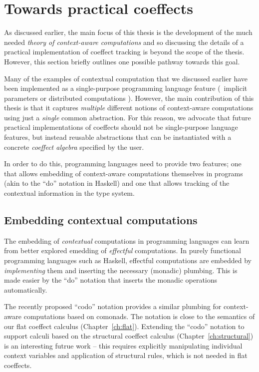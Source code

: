 \section{Towards practical coeffects}
\label{sec:unified-impl}

As discussed earlier, the main focus of this thesis is the development of the much needed 
\emph{theory of context-aware computations} and so discussing the details of a practical 
implementation of coeffect tracking is beyond the scope of the thesis. However, this section
briefly outlines one possible pathway towards this goal.

Many of the examples of contextual computation that we discussed earlier have been implemented as 
a single-purpose programming language feature (\eg~implicit parameters \cite{app-implicit-parameters} 
or distributed computations \cite{app-distributed-ml5,app-distributed-links}). However, 
the main contribution of this thesis is that it captures
\emph{multiple} different notions of context-aware computations using just a \emph{single}
common abstraction. For this reason, we advocate that future practical implementations of
coeffects should not be single-purpose language features, but instead reusable abstractions that
can be instantiated with a concrete \emph{coeffect algebra} specified by the user.

In order to do this, programming languages need to provide two features; one that allows 
embedding of context-aware computations themselves in programs (akin to the ``do'' notation
in Haskell) and one that allows tracking of the contextual information in the type system.


\subsection{Embedding contextual computations}

The embedding of \emph{contextual} computations in programming languages can learn from better 
explored emedding of \emph{effectful} computations. In purely functional programming languages
such as Haskell, effectful computations are embedded by \emph{implementing} them and inserting the
necessary (monadic) plumbing. This is made easier by the ``do'' notation \cite{other-haskell98} 
that inserts the monadic operations automatically.

The recently proposed ``codo'' notation \cite{comonads-codo} provides a similar plumbing for
context-aware computations based on comonads. The notation is close to the semantics of our 
flat coeffect calculus (Chapter~\ref{ch:flat}). Extending the ``codo'' notation to support calculi based 
on the structural coeffect calculus (Chapter~\ref{ch:structural}) is an interesting futrue work -- 
this requires explicitly manipulating individual context variables and application of structural
rules, which is not needed in flat coeffects.

